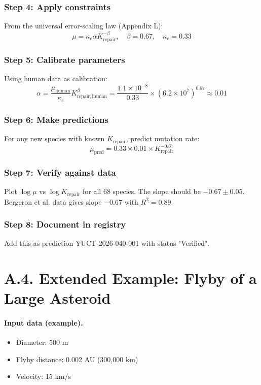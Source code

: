 \documentclass[13pt,a4paper]{article}
\begin{document}
	\subsubsection*{Step 4: Apply constraints}
	From the universal error-scaling law (Appendix L):
	\[
	\mu = \kappa_c \alpha K_{\mathrm{repair}}^{-\beta}, \quad \beta = 0.67, \quad \kappa_c = 0.33
	\]
	
	\subsubsection*{Step 5: Calibrate parameters}
	Using human data as calibration:
	\[
	\alpha = \frac{\mu_{\mathrm{human}}}{\kappa_c} K_{\mathrm{repair,human}}^{\beta} = \frac{1.1\times 10^{-8}}{0.33} \times (6.2\times 10^7)^{0.67} \approx 0.01
	\]
	
	\subsubsection*{Step 6: Make predictions}
	For any new species with known \(K_{\mathrm{repair}}\), predict mutation rate:
	\[
	\mu_{\mathrm{pred}} = 0.33 \times 0.01 \times K_{\mathrm{repair}}^{-0.67}
	\]
	
	\subsubsection*{Step 7: Verify against data}
	Plot \(\log \mu\) vs \(\log K_{\mathrm{repair}}\) for all 68 species. The slope should be \(-0.67 \pm 0.05\). Bergeron et al. data gives slope \(-0.67\) with \(R^2 = 0.89\).
	
	\subsubsection*{Step 8: Document in registry}
	Add this as prediction YUCT-2026-040-001 with status "Verified".
	
	
	\section*{A.4. Extended Example: Flyby of a Large Asteroid}
	
	\paragraph{Input data (example).}
	\begin{itemize}[leftmargin=*]
		\item Diameter: 500 m
		\item Flyby distance: 0.002 AU (300{,}000 km)
		\item Velocity: 15 km/s
	\end{itemize}
	
\end{document}
